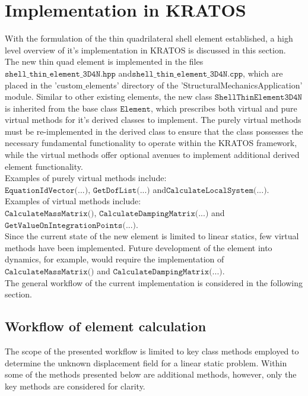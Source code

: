 \section{Implementation in KRATOS}

With the formulation of the thin quadrilateral shell element established, a high level overview of it's implementation in KRATOS is discussed in this section.\\

The new thin quad element is implemented in the files $\texttt{shell\_thin\_element\_3D4N.hpp}$ and\break$\texttt{shell\_thin\_element\_3D4N.cpp}$, which are placed in the 'custom$\_$elements' directory of the 'StructuralMechanicsApplication' module. Similar to other existing elements, the new class $\texttt{ShellThinElement3D4N}$ is inherited from the base class $\texttt{Element}$, which prescribes both virtual and pure virtual methods for it's derived classes to implement. The purely virtual methods must be re-implemented in the derived class to ensure that the class possesses the necessary fundamental functionality to operate within the KRATOS framework, while the virtual methods offer optional avenues to implement additional derived element functionality. \\

Examples of purely virtual methods include: $\texttt{EquationIdVector(...),\ GetDofList(...)}$ and\break $\texttt{CalculateLocalSystem(...)}$. \\

Examples of virtual methods include: $\texttt{CalculateMassMatrix(),\ CalculateDampingMatrix(...)}$ and $\texttt{GetValueOnIntegrationPoints(...)}$. \\

Since the current state of the new element is limited to linear statics, few virtual methods have been implemented. Future development of the element into dynamics, for example, would require the implementation of $\texttt{CalculateMassMatrix()}$ and $\texttt{CalculateDampingMatrix(...)}$.\\

The general workflow of the current implementation is considered in the following section.

\subsection{Workflow of element calculation}

The scope of the presented workflow is limited to key class methods employed to determine the unknown displacement field for a linear static problem. Within some of the methods presented below are additional methods, however, only the key methods are considered for clarity.





